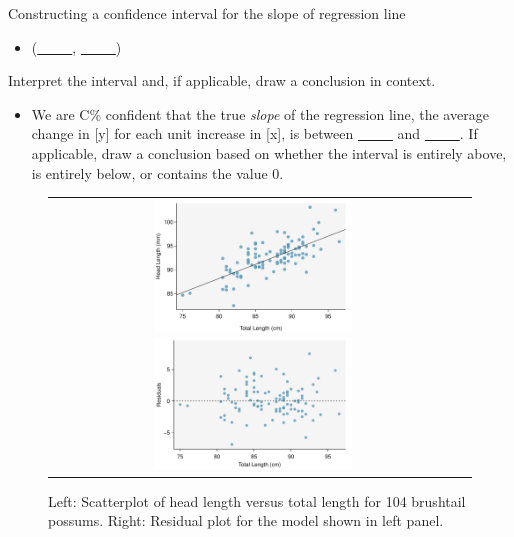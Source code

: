 \begin{onebox}{Constructing a confidence interval for the slope of regression line}
\begin{itemize}
\begin{itemize}
\item[] $t^{\star}$: use a $t$-distribution with $df = n-2$ and confidence level C\%
\end{itemize}
\item[] (\underline{\ \ \ \ \ }, \underline{\ \ \ \ \ })
\end{itemize}
  Interpret the interval and, if applicable, draw a conclusion in context.\vspace{-1mm}
\begin{itemize}
\item[] We are C\%  confident that the true \emph{slope} of the regression line, the average change in [y] for each unit increase in [x], is between \underline{\ \ \ \ \ } and \underline{\ \ \ \ \ }. If applicable, draw a conclusion based on whether the interval is entirely above, is entirely below, or contains the value 0. 
\end{itemize}
\end{onebox}

\begin{figure}%
   \centering
  \begin{tabular}{cc}
   \includegraphics[width=0.5\textwidth]{ch_regr_simple_linear/figures/possumInference/possumScatter}
   \includegraphics[width=0.5\textwidth]{ch_regr_simple_linear/figures/possumInference/possumResidual}
\end{tabular}
   \caption{Left: Scatterplot of head length versus total length for 104 brushtail possums.   Right: Residual plot for the model shown in left panel.  }
\label{possumInferencePlots}
\end{figure}

